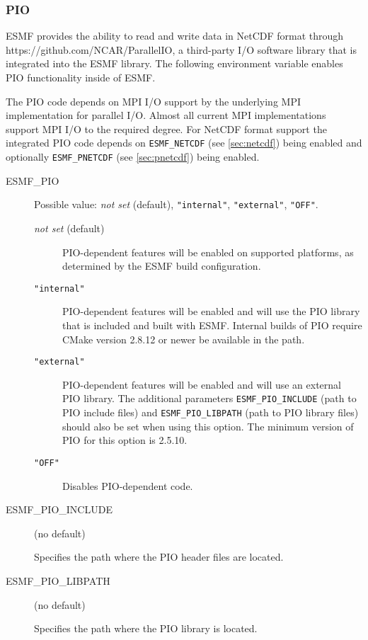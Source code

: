 \subsubsection{PIO}
\label{sec:pio}
ESMF provides the ability to read and write data in
NetCDF format through 
{https://github.com/NCAR/ParallelIO}, a third-party I/O software
library that is integrated into the ESMF library. The following environment
variable enables PIO functionality inside of ESMF.

The PIO code depends on MPI I/O support by the underlying MPI
implementation for parallel I/O. Almost all current MPI
implementations support MPI I/O to the required degree. For NetCDF format
support the integrated PIO code depends on {\tt ESMF\_NETCDF} (see \ref{sec:netcdf})
being enabled and optionally {\tt ESMF\_PNETCDF} (see \ref{sec:pnetcdf})
being enabled.

\begin{description}
\item[ESMF\_PIO] Possible value: {\it not set} (default), {\tt "internal"},
{\tt "external"}, {\tt "OFF"}.

\begin{description}
\item[{\it not set} (default)] PIO-dependent features will be enabled on supported
platforms, as determined by the ESMF build configuration.

\item[{\tt "internal"}] PIO-dependent features will be enabled and will use the
PIO library that is included and built with ESMF. Internal builds of PIO require
CMake version 2.8.12 or newer be available in the path.

\item[{\tt "external"}] PIO-dependent features will be enabled and will use an
external PIO library.  The additional parameters {\tt ESMF\_PIO\_INCLUDE} 
(path to PIO include files) and {\tt ESMF\_PIO\_LIBPATH} (path to PIO library
files) should also be set when using this option. The minimum version of PIO for
this option is 2.5.10.

\item[{\tt "OFF"}] Disables PIO-dependent code.

\end{description}


\item[ESMF\_PIO\_INCLUDE] (no default)

Specifies the path where the PIO header files are located.

\item[ESMF\_PIO\_LIBPATH] (no default)

Specifies the path where the PIO library is located.

\end{description}

